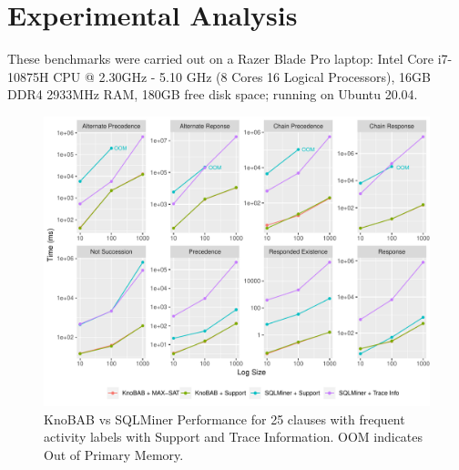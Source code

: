 
\section{Experimental Analysis}\label{sec:exp}
These benchmarks were carried out on a Razer Blade Pro laptop: Intel Core i7-10875H CPU @ 2.30GHz - 5.10 GHz (8 Cores 16 Logical Processors), 16GB DDR4 2933MHz RAM, 180GB free disk space; running on Ubuntu 20.04.

\begin{figure}[!t]
	\centering
	\includegraphics[width=.8\textwidth]{images/sqlminer_benchmark.pdf}
	\caption{KnoBAB vs SQLMiner Performance for 25  clauses with frequent activity labels with Support and Trace Information. OOM indicates Out of Primary Memory.}\label{fig:vsSQL}
\end{figure}



